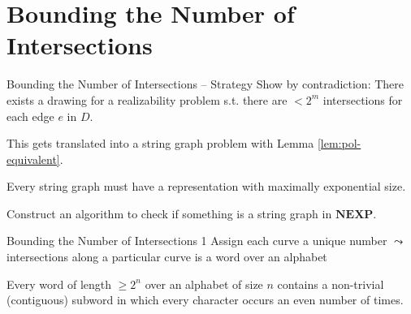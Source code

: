 \documentclass[10pt,aspectratio=169]{beamer}
\theoremstyle{plain}
\begin{document}
\section{Bounding the Number of Intersections}

\begin{frame}{Bounding the Number of Intersections -- Strategy}
    Show by contradiction: There exists a drawing for a realizability problem 
    s.t. there are \(< 2^m\) intersections for each edge \(e\) in \(D\).\pause

    This gets translated into a string graph problem with Lemma \ref{lem:pol-equivalent}.\pause

    Every string graph must have a representation with maximally exponential size.\pause

    Construct an algorithm to check if something is a string graph in \(\mathbf{NEXP}\).
\end{frame}

\begin{frame}{Bounding the Number of Intersections 1}
    Assign each curve a unique number \(\leadsto\) intersections along a particular curve is a word over an alphabet
    \begin{lemma}
        Every word of length \(\geq 2^n\) over an alphabet of size \(n\) contains a non-trivial (contiguous) subword in which every character occurs an even number of times.
        \label{lem:even-occurrences}
    \end{lemma}
\end{frame}
\end{document}
